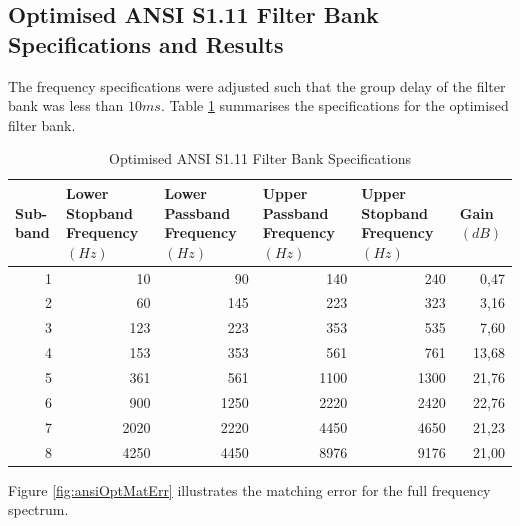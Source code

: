\documentclass[11pt,onecolumn]{witseiepaper}
\begin{document}
\begin{appendices}
\section{Optimised ANSI S1.11 Filter Bank Specifications and Results}
\label{app:ansiOptSpec}

\noindent The frequency specifications were adjusted such that the group delay of the filter bank was less than $10ms$. Table \ref{tab:ansiOptSpec} summarises the specifications for the optimised filter bank.

\begin{table}[htbp]
  \centering
  \caption{Optimised ANSI S1.11 Filter Bank Specifications}
  \begin{adjustbox}{width=0.9\linewidth}
    \begin{tabular}{|r|r|r|r|r|r|}
    \hline
    \multicolumn{1}{|l|}{\textbf{Sub-band}} & \multicolumn{1}{l|}{\textbf{Lower Stopband Frequency $(Hz)$}} & \multicolumn{1}{l|}{\textbf{Lower Passband Frequency $(Hz)$}} & \multicolumn{1}{l|}{\textbf{Upper Passband Frequency $(Hz)$}} & \multicolumn{1}{l|}{\textbf{Upper Stopband Frequency $(Hz)$}} & \multicolumn{1}{l|}{\textbf{Gain $(dB)$}} \\
    \hline
    1     & 10    & 90    & 140   & 240   & 0,47 \\
    \hline
    2     & 60    & 145   & 223   & 323   & 3,16 \\
    \hline
    3     & 123   & 223   & 353   & 535   & 7,60 \\
    \hline
    4     & 153   & 353   & 561   & 761   & 13,68 \\
    \hline
    5     & 361   & 561   & 1100  & 1300  & 21,76 \\
    \hline
    6     & 900   & 1250  & 2220  & 2420  & 22,76 \\
    \hline
    7     & 2020  & 2220  & 4450  & 4650  & 21,23 \\
    \hline
    8     & 4250  & 4450  & 8976  & 9176  & 21,00 \\
    \hline
    \end{tabular}%
    \end{adjustbox}
  \label{tab:ansiOptSpec}%
\end{table}%

\noindent Figure \ref{fig:ansiOptMatErr} illustrates the matching error for the full frequency spectrum.


\end{appendices}
\end{document}
